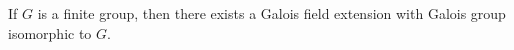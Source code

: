 If $G$ is a finite group, then there exists a Galois field extension with Galois group isomorphic to $G$.
